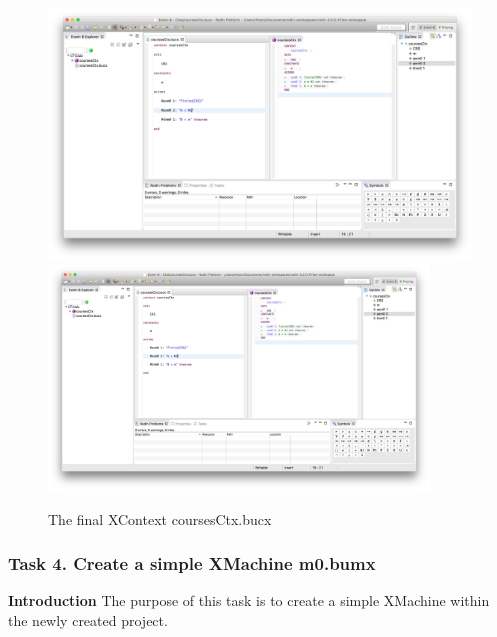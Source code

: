   \begin{figure}[!htbp]
    \centering
    \ifplastex
    \includegraphics[width=512]{figures/CoursesCtx}
    \else
    \includegraphics[width=0.9\textwidth]{figures/CoursesCtx}
    \fi
    \caption{The final XContext coursesCtx.bucx}
    \label{fig:CoursesCtx}
  \end{figure}



\subsubsection{Task 4. Create a simple XMachine m0.bumx}\label{CreateMachine}
\textbf{Introduction} The purpose of this task is to create a simple XMachine within the newly created project.

